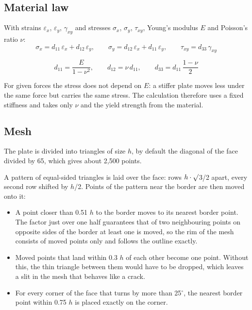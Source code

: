 \documentclass[11pt,a4paper]{article}
\begin{document}
\subsection{Material law}
 

With strains $\varepsilon _{x}$, $\varepsilon _{y}$, $\gamma _{xy}$ and stresses $\sigma _{x}$, $\sigma _{y}$, $\tau _{xy}$, Young's modulus $E$ and Poisson's ratio $\nu $: 
\begin{equation}
\sigma_x = d_{11}\,\varepsilon_x + d_{12}\,\varepsilon_y, \qquad \sigma_y = d_{12}\,\varepsilon_x + d_{11}\,\varepsilon_y, \qquad \tau_{xy} = d_{33}\,\gamma_{xy}
\end{equation}
 
\begin{equation}
d_{11} = \frac{E}{1 - \nu^2}, \qquad d_{12} = \nu\, d_{11}, \qquad d_{33} = d_{11}\,\frac{1 - \nu}{2}
\end{equation}
 

For given forces the stress does not depend on $E$: a stiffer plate moves less under the same force but carries the same stress. The calculation therefore uses a fixed stiffness and takes only $\nu $ and the yield strength from the material. 

\subsection{Mesh}
 

The plate is divided into triangles of size $h$, by default the diagonal of the face divided by 65, which gives about 2,500 points. 

A pattern of equal-sided triangles is laid over the face: rows $h\cdot \surd $3/2 apart, every second row shifted by $h$/2. Points of the pattern near the border are then moved onto it: 
\begin{itemize}
 
\item A point closer than 0.51 $h$ to the border moves to its nearest border point. The factor just over one half guarantees that of two neighbouring points on opposite sides of the border at least one is moved, so the rim of the mesh consists of moved points only and follows the outline exactly. 
\item Moved points that land within 0.3 $h$ of each other become one point. Without this, the thin triangle between them would have to be dropped, which leaves a slit in the mesh that behaves like a crack. 
\item For every corner of the face that turns by more than 25$^\circ $, the nearest border point within 0.75 $h$ is placed exactly on the corner. 
\end{itemize}
 
\end{document}
